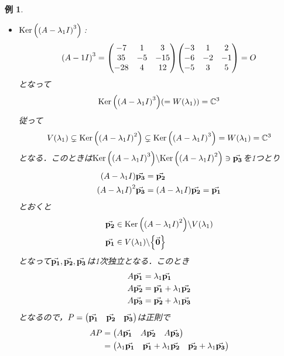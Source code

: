 \documentclass[autodetect-engine,dvipdfmx-if-dvi,ja=standard]{bxjsarticle}
\theoremstyle{mystyle1}
\theoremstyle{mystyle2}
\newtheorem{example}{例}
\newcommand{\bbC}{\ensuremath{\mathbb{C}}}
\newcommand{\Ker}{\ensuremath{\text{Ker\,}}}
\begin{document}
\begin{example}
\begin{itemize}
\[            0
            ),\mqty(
            3\\
            0\\
            7
            )\right>_\bbC\]
          で
          \[\dim_\bbC\Ker\qty(\qty(A-\lambda_1I)^2)=2\]
          で全体ではない．
    \item \underline{$\Ker\qty(\qty(A-\lambda_1I)^3)$}\,:
          \[\qty(A-1I)^3=\mqty(
            -7&1&3\\
            35&-5&-15\\
            -28&4&12
            )\mqty(
            -3&1&2\\
            -6&-2&-1\\
            -5&3&5
            )=O\]
          となって
          \[\Ker\qty(\qty(A-\lambda_1I)^3)\qty(=W\qty(\lambda_1))=\bbC^3\]
          従って
          \[V\qty(\lambda_1)\subsetneq\Ker\qty(\qty(A-\lambda_1I)^2)\subsetneq\Ker\qty(\qty(A-\lambda_1I)^3)=W\qty(\lambda_1)=\bbC^3\]
          となる．このときは$\Ker\qty(\qty(A-\lambda_1I)^3)\backslash\Ker\qty(\qty(A-\lambda_1I)^2)\ni\va{p_3}$を1つとり
          \begin{align*}
            \qty(A-\lambda_1I)\va{p_3}   & =\va{p_2}                            \\
            \qty(A-\lambda_1I)^2\va{p_3} & =\qty(A-\lambda_1I)\va{p_2}=\va{p_1}
          \end{align*}
          とおくと
          \begin{align*}
            \va{p_2} & \in\Ker\qty(\qty(A-\lambda_1I)^2)\backslash V\qty(\lambda_1) \\
            \va{p_1} & \in V\qty(\lambda_1)\backslash\qty{\va{0}}
          \end{align*}
          となって$\va{p_1},\va{p_2},\va{p_3}$は1次独立となる．このとき
          \begin{align*}
            A\va{p_1} & =\lambda_1\va{p_1}          \\
            A\va{p_2} & =\va{p_1}+\lambda_1\va{p_2} \\
            A\va{p_3} & =\va{p_2}+\lambda_1\va{p_3}
          \end{align*}
          となるので，$P=\mqty(\va{p_1}&\va{p_2}&\va{p_3})$は正則で
          \begin{align*}
            AP
                      & =\mqty(A\va{p_1}         & A\va{p_2}                  & A\va{p_3})                  \\
                      & =\mqty(\lambda_1\va{p_1} & \va{p_1}+\lambda_1\va{p_2} & \va{p_2}+\lambda_1\va{p_3}) \\

\end{align*}
\end{itemize}
\end{example}
\end{document}

